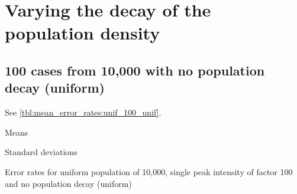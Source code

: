 \section{Varying the decay of the population density}

\subsection{100 cases from 10,000 with no population decay (uniform)}

See \autoref{tbl:mean_error_rates:unif_100_unif}.

\begin{table}[H]
\centering
\scriptsize

    \begin{subtable}{0.5\textwidth}
    
    \caption[]{Means} 
    \end{subtable}%
    \begin{subtable}{0.5\textwidth}
    
    \caption[]{Standard deviations} 
    \end{subtable}

\caption[]{Error rates for uniform population of 10,000, single peak intensity of factor 100 and no population decay (uniform)}
\label{tbl:mean_error_rates:unif_100_unif:3}
\end{table}


%     
%     


